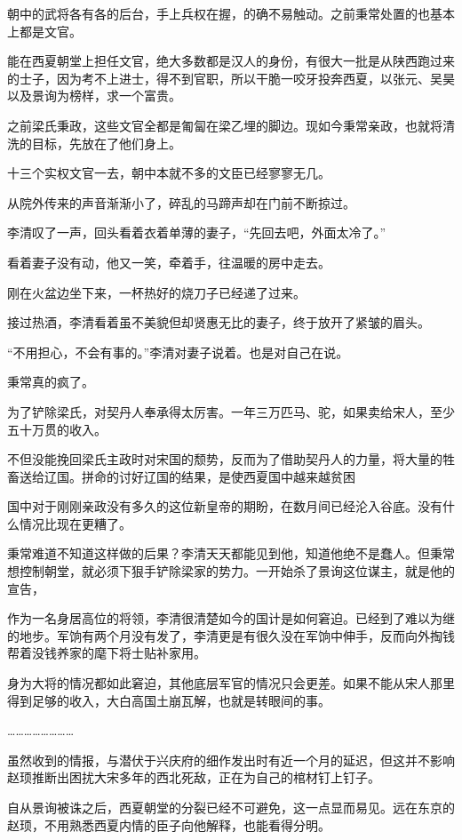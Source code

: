 朝中的武将各有各的后台，手上兵权在握，的确不易触动。之前秉常处置的也基本上都是文官。

能在西夏朝堂上担任文官，绝大多数都是汉人的身份，有很大一批是从陕西跑过来的士子，因为考不上进士，得不到官职，所以干脆一咬牙投奔西夏，以张元、吴昊以及景询为榜样，求一个富贵。

之前梁氏秉政，这些文官全都是匍匐在梁乙埋的脚边。现如今秉常亲政，也就将清洗的目标，先放在了他们身上。

十三个实权文官一去，朝中本就不多的文臣已经寥寥无几。

从院外传来的声音渐渐小了，碎乱的马蹄声却在门前不断掠过。

李清叹了一声，回头看着衣着单薄的妻子，“先回去吧，外面太冷了。”

看着妻子没有动，他又一笑，牵着手，往温暖的房中走去。

刚在火盆边坐下来，一杯热好的烧刀子已经递了过来。

接过热酒，李清看着虽不美貌但却贤惠无比的妻子，终于放开了紧皱的眉头。

“不用担心，不会有事的。”李清对妻子说着。也是对自己在说。

秉常真的疯了。

为了铲除梁氏，对契丹人奉承得太厉害。一年三万匹马、驼，如果卖给宋人，至少五十万贯的收入。

不但没能挽回梁氏主政时对宋国的颓势，反而为了借助契丹人的力量，将大量的牲畜送给辽国。拼命的讨好辽国的结果，是使西夏国中越来越贫困

国中对于刚刚亲政没有多久的这位新皇帝的期盼，在数月间已经沦入谷底。没有什么情况比现在更糟了。

秉常难道不知道这样做的后果？李清天天都能见到他，知道他绝不是蠢人。但秉常想控制朝堂，就必须下狠手铲除梁家的势力。一开始杀了景询这位谋主，就是他的宣告，

作为一名身居高位的将领，李清很清楚如今的国计是如何窘迫。已经到了难以为继的地步。军饷有两个月没有发了，李清更是有很久没在军饷中伸手，反而向外掏钱帮着没钱养家的麾下将士贴补家用。

身为大将的情况都如此窘迫，其他底层军官的情况只会更差。如果不能从宋人那里得到足够的收入，大白高国土崩瓦解，也就是转眼间的事。

……………………

虽然收到的情报，与潜伏于兴庆府的细作发出时有近一个月的延迟，但这并不影响赵顼推断出困扰大宋多年的西北死敌，正在为自己的棺材钉上钉子。

自从景询被诛之后，西夏朝堂的分裂已经不可避免，这一点显而易见。远在东京的赵顼，不用熟悉西夏内情的臣子向他解释，也能看得分明。

